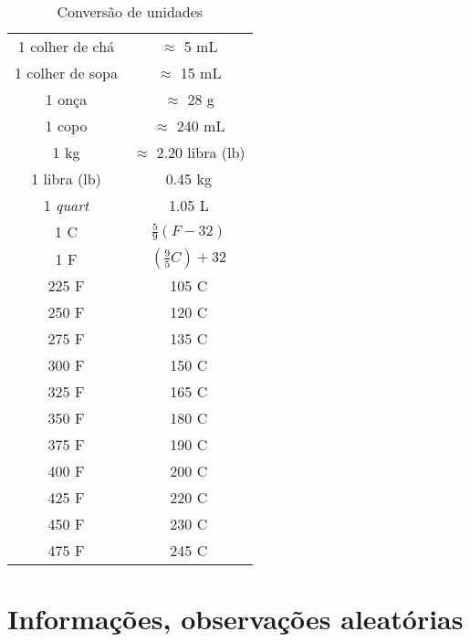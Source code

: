 \begin{table}[h]
	\centering
	\begin{tabular}[h]{c c}
		\hline
		1 colher de chá  & $\approx$ 5 mL                    \\
		1 colher de sopa & $\approx$ 15 mL                   \\
		1 onça           & $\approx$ 28 g                    \\
		1 copo           & $\approx$ 240 mL                  \\
    1 kg          & $\approx$ 2.20 libra (lb)            \\
    1 libra (lb) & 0.45 kg \\
    1 \emph{quart} & 1.05 L \\
		\hline
		1 \grau C        & $\frac{5}{9} \left( F-32 \right)$ \\
		1 \grau F        & $\left(\frac{9}{5} C\right)+32$   \\
		\hline
		225 \grau F      & 105 \grau C                       \\
		250 \grau F      & 120 \grau C                       \\
		275 \grau F      & 135 \grau C                       \\
		300 \grau F      & 150 \grau C                       \\
		325 \grau F      & 165 \grau C                       \\
		350 \grau F      & 180 \grau C                       \\
		375 \grau F      & 190 \grau C                       \\
		400 \grau F      & 200 \grau C                       \\
		425 \grau F      & 220 \grau C                       \\
		450 \grau F      & 230 \grau C                       \\
		475 \grau F      & 245 \grau C                       \\
		\hline
	\end{tabular}
	\caption{Conversão de unidades}
	\label{tab:conversao_unidades}
\end{table}

\clearpage
\section{Informações, observações aleatórias}

